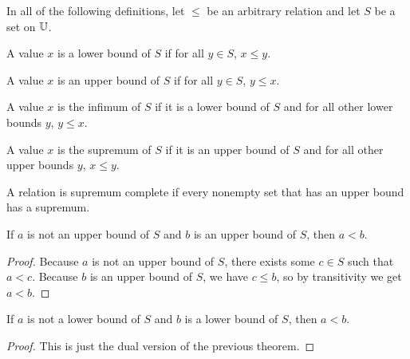 \documentclass[../../math.tex]{subfiles}
\begin{document}
In all of the following definitions, let $\leq$ be an arbitrary relation and let
$S$ be a set on $\mathbb{U}$.

\begin{definition}
    A value $x$ is a lower bound of $S$ if for all $y \in S$, $x \leq y$.
\end{definition}

\begin{definition}
    A value $x$ is an upper bound of $S$ if for all $y \in S$, $y \leq x$.
\end{definition}

\begin{definition}
    A value $x$ is the infimum of $S$ if it is a lower bound of $S$ and for all
    other lower bounds $y$, $y \leq x$.
\end{definition}

\begin{definition}
    A value $x$ is the supremum of $S$ if it is an upper bound of $S$ and for
    all other upper bounds $y$, $x \leq y$.
\end{definition}

\begin{class}
    A relation is supremum complete if every nonempty set that has an upper
    bound has a supremum.
\end{class}

\begin{theorem} \label{upper_bound_leq}
    If $a$ is not an upper bound of $S$ and $b$ is an upper bound of $S$, then
    $a < b$.
\end{theorem}
\begin{proof}
    Because $a$ is not an upper bound of $S$, there exists some $c \in S$ such
    that $a < c$.  Because $b$ is an upper bound of $S$, we have $c \leq b$, so
    by transitivity we get $a < b$.
\end{proof}

\begin{theorem} \label{lower_bound_leq}
    If $a$ is not a lower bound of $S$ and $b$ is a lower bound of $S$, then $a
    < b$.
\end{theorem}
\begin{proof}
    This is just the dual version of the previous theorem.
\end{proof}
\end{document}
